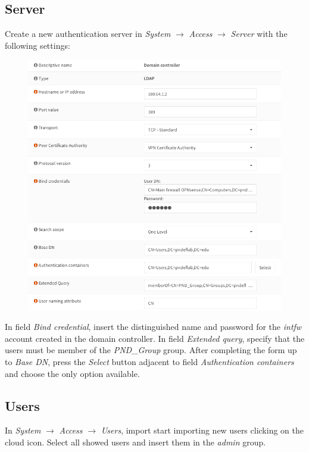 \documentclass[draft]{homework}
\newcommand{\intfw}{\textit{intfw}\xspace}
\begin{document}
    \subsection{Server}
    Create a new authentication server in \textit{System} $\rightarrow$ \textit{Access} $\rightarrow$ \textit{Server} with the following settings:
    \begin{figure}[H]
        \centering
        \includegraphics[width=\linewidth]{images/server}
        \label{fig:server}
    \end{figure}
    In field \textit{Bind credential}, insert the distinguished name and password for the \intfw account created in the domain controller.
    In field \textit{Extended query}, specify that the users must be member of the \textit{PND\_Group} group.
    After completing the form up to \textit{Base DN}, press the \textit{Select} button adjacent to field \textit{Authentication containers} and choose the only option available.
    
    \subsection{Users}
    In \textit{System} $\rightarrow$ \textit{Access} $\rightarrow$ \textit{Users}, import start importing new users clicking on the cloud icon.
    Select all showed users and insert them in the \textit{admin} group.
    
\end{document}
